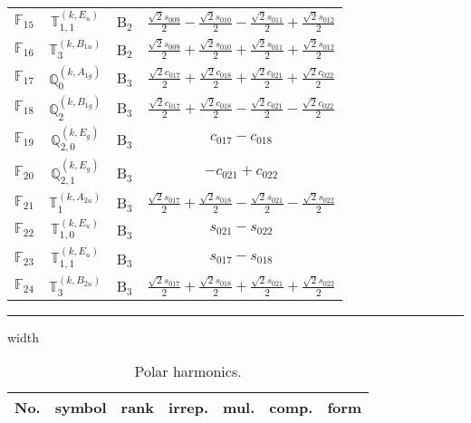 \documentclass[fleqn,10pt,landscape]{article}
\begin{document}
\begin{itemize}
\begin{center}
\begin{longtable}{c|c|c|c}
$ \mathbb{F}_{15} $ & $\mathbb{T}_{1,1}^{(k,E_{u})}$ & B$_{2}$ & $\frac{\sqrt{2} s_{009}}{2} - \frac{\sqrt{2} s_{010}}{2} - \frac{\sqrt{2} s_{011}}{2} + \frac{\sqrt{2} s_{012}}{2}$ \\
$ \mathbb{F}_{16} $ & $\mathbb{T}_{3}^{(k,B_{1u})}$ & B$_{2}$ & $\frac{\sqrt{2} s_{009}}{2} + \frac{\sqrt{2} s_{010}}{2} + \frac{\sqrt{2} s_{011}}{2} + \frac{\sqrt{2} s_{012}}{2}$ \\ \hline
$ \mathbb{F}_{17} $ & $\mathbb{Q}_{0}^{(k,A_{1g})}$ & B$_{3}$ & $\frac{\sqrt{2} c_{017}}{2} + \frac{\sqrt{2} c_{018}}{2} + \frac{\sqrt{2} c_{021}}{2} + \frac{\sqrt{2} c_{022}}{2}$ \\
$ \mathbb{F}_{18} $ & $\mathbb{Q}_{2}^{(k,B_{1g})}$ & B$_{3}$ & $\frac{\sqrt{2} c_{017}}{2} + \frac{\sqrt{2} c_{018}}{2} - \frac{\sqrt{2} c_{021}}{2} - \frac{\sqrt{2} c_{022}}{2}$ \\
$ \mathbb{F}_{19} $ & $\mathbb{Q}_{2,0}^{(k,E_{g})}$ & B$_{3}$ & $c_{017} - c_{018}$ \\
$ \mathbb{F}_{20} $ & $\mathbb{Q}_{2,1}^{(k,E_{g})}$ & B$_{3}$ & $- c_{021} + c_{022}$ \\
$ \mathbb{F}_{21} $ & $\mathbb{T}_{1}^{(k,A_{2u})}$ & B$_{3}$ & $\frac{\sqrt{2} s_{017}}{2} + \frac{\sqrt{2} s_{018}}{2} - \frac{\sqrt{2} s_{021}}{2} - \frac{\sqrt{2} s_{022}}{2}$ \\
$ \mathbb{F}_{22} $ & $\mathbb{T}_{1,0}^{(k,E_{u})}$ & B$_{3}$ & $s_{021} - s_{022}$ \\
$ \mathbb{F}_{23} $ & $\mathbb{T}_{1,1}^{(k,E_{u})}$ & B$_{3}$ & $s_{017} - s_{018}$ \\
$ \mathbb{F}_{24} $ & $\mathbb{T}_{3}^{(k,B_{2u})}$ & B$_{3}$ & $\frac{\sqrt{2} s_{017}}{2} + \frac{\sqrt{2} s_{018}}{2} + \frac{\sqrt{2} s_{021}}{2} + \frac{\sqrt{2} s_{022}}{2}$ \\
\end{longtable}
\end{center}

 \hfil \hrule height 1mm width \textwidth \hfil

\begin{center}
\renewcommand{\arraystretch}{1.3}
\begin{longtable}{ccccccc}
\caption{Polar harmonics.}
 \\
 \hline \hline
No. & symbol & rank & irrep. & mul. & comp. & form \\ \hline \endfirsthead


\end{longtable}
\end{center}
\end{itemize}
\end{document}

